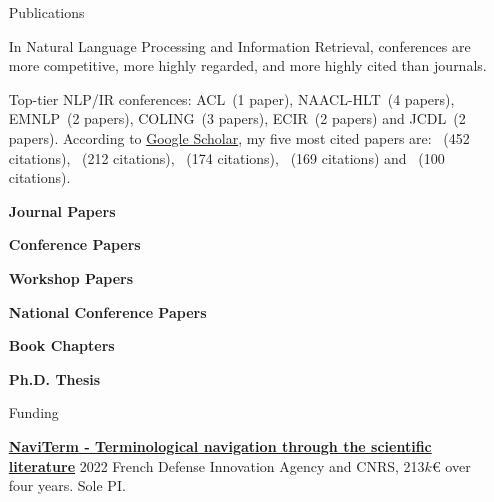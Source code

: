 \documentclass[11pt,a4paper]{article}
\begin{document}
\begin{itemize}
\item[Publications]

In Natural Language Processing and Information Retrieval, conferences are more 
competitive, more highly regarded, and more highly cited than journals.


Top-tier NLP/IR conferences:  ACL~(1 paper), NAACL-HLT~(4 papers), EMNLP~(2 papers), COLING~(3 papers), ECIR~(2 papers) and JCDL~(2 papers).
%
%
According to \href{https://scholar.google.com/citations?user=Vk68rbkAAAAJ}{Google Scholar}, my five most cited papers are: \cite{bougouin-boudin-daille:2013:IJCNLP}~{\small (452 citations)}, \cite{boudin:2018:NAACL}~{\small (212 citations)},  \cite{boudin-EtAl:2010:BMC}~{\small (174 citations)},  \cite{boudin:2013:IJCNLP}~{\small (169 citations)} and \cite{boudin-morin:2013:NAACL-HLT}~{\small (100 citations)}.



\vspace{1em}

\nocite{*}

\textbf{Journal Papers}
\printbibliography[heading=none,type=article]


\textbf{Conference Papers}
\printbibliography[heading=none,type=inproceedings,keyword=intConf]

\textbf{Workshop Papers}
\printbibliography[heading=none,type=inproceedings,keyword=workshop]

\textbf{National Conference Papers}
\printbibliography[heading=none,type=inproceedings,keyword=natConf]


\textbf{Book Chapters}
\printbibliography[heading=none,type=inbook]

\textbf{Ph.D. Thesis}
\printbibliography[heading=none,type=thesis]

\item[Funding]

\href{https://cnrs-naviterm.github.io/}{\textbf{NaviTerm - Terminological navigation through the scientific literature}} \hfill 2022 \newline
French Defense Innovation Agency and CNRS, 213$k$\euro{} over four years. Sole PI.


\end{itemize}
\end{document}
